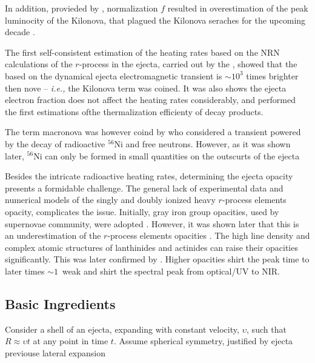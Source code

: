 \documentclass[11pt,a4paper,headinclude=true,DIV=14,BCOR=8mm,chapterprefix,listof=totoc,twoside,openright,abstracton]{scrbook}
\begin{document}
In addition, provieded by \cite{Li and Paczynski (1998)}, normalization $f$ resulted in overestimation of the peak luminocity of the Kilonova, that plagued the Kilonova seraches for the upcoming decade \cite{Rosswog (2005), (Dong et al 2016), (Bloom et al 2006), Kocevski et al 2010}. 

The first self-consistent estimation of the heating rates based on the NRN calculations of the $r$-process in the ejecta, carried out by the \cite{Metzger et al (2010b)}, showed that the based on the dynamical ejecta electromagnetic transient is $\sim10^3$ times brighter then nove -- \textit{i.e.,} the Kilonova term was coined. It was also shows the ejecta electron fraction does not affect the heating rates considerably, and performed the first estimations ofthe thermalization efficienty of decay products. 

The term macronova was however coind by \cite{Kulkarni (2005)} who considered a transient powered by the decay of radioactive $^{56}$Ni and free neutrons. However, as it was shown later, $^{56}$Ni can only be formed in small quantities on the outscurts of the ejecta

Besides the intricate radioactive heating rates, determining the ejecta opacity presents a formidable challenge. 
The general lack of experimental data and numerical models of the singly and doubly ionized heavy $r$-process elements opacity, complicates the issue. Initially, gray iron group opacities, used by supernovae community, were adopted \cite{Roberts et al (2011)}. However, it was shown later that this is an underestimation of the $r$-process elements opacities \cite{Kasen et al (2013)}. The high line density and complex atomic structures of lanthinides and actinides can raise their opacities significantly. This was later confirmed by \cite{Tanaka and Hotokezaka (2013).} . Higher opacities shirt the peak time to later times $\sim 1$~weak \cite{(Barnes and Kasen 2013)} and shirt the spectral peak from optical/UV to NIR. 


\subsection{Basic Ingredients}

Consider a shell of an ejecta, expanding with constant velocity, $\upsilon$, such that $R\approx\upsilon t$ at any point in time $t$. Assume spherical symmetry, justified by ejecta previouse lateral expansion \cite{(Roberts et al 2011; Grossman et al 2014; Rosswog et al 2014).}
\end{document}
